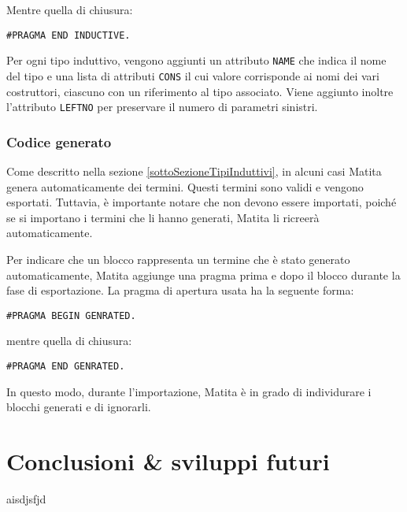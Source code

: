 \documentclass[12pt,a4paper]{mimosis}
\begin{document}
Mentre quella di chiusura:
\begin{center}
  \texttt{\#PRAGMA END INDUCTIVE.}
\end{center}

Per ogni tipo induttivo, vengono aggiunti un attributo \texttt{NAME} che indica 
il nome del tipo e una lista di attributi \texttt{CONS} il cui valore corrisponde
ai nomi dei vari costruttori, ciascuno con un riferimento al tipo associato.
Viene aggiunto inoltre l'attributo \texttt{LEFTNO} per preservare il numero di
parametri sinistri.

\subsection{Codice generato}
Come descritto nella sezione \ref{sottoSezioneTipiInduttivi}, in alcuni casi
Matita genera automaticamente dei termini. Questi termini sono validi e vengono
esportati. Tuttavia, è importante notare che non devono essere importati, poiché
se si importano i termini che li hanno generati, Matita li ricreerà automaticamente.

Per indicare che un blocco rappresenta un termine che è stato generato automaticamente,
Matita aggiunge una pragma prima e dopo il blocco durante la fase di esportazione.
La pragma di apertura usata ha la seguente forma:
\begin{center}
  \texttt{\#PRAGMA BEGIN GENRATED.}
\end{center}

mentre quella di chiusura:
\begin{center}
  \texttt{\#PRAGMA END GENRATED.}
\end{center}

In questo modo, durante l'importazione, Matita è in grado di individurare i
blocchi generati e di ignorarli.


 \chapter{Conclusioni \& sviluppi futuri}
 aisdjsfjd

\printbibliography


\end{document}
